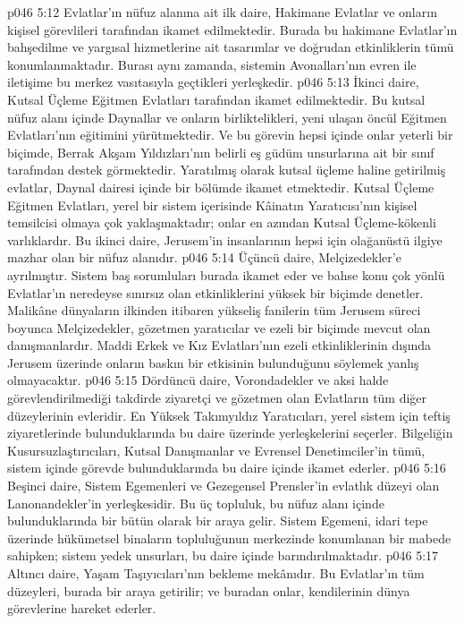 \vs p046 5:12 Evlatlar’ın nüfuz alanına ait ilk daire, Hakimane Evlatlar ve onların kişisel görevlileri tarafından ikamet edilmektedir. Burada bu hakimane Evlatlar’ın bahşedilme ve yargısal hizmetlerine ait tasarımlar ve doğrudan etkinliklerin tümü konumlanmaktadır. Burası aynı zamanda, sistemin Avonalları’nın evren ile iletişime bu merkez vasıtasıyla geçtikleri yerleşkedir.
\vs p046 5:13 İkinci daire, Kutsal Üçleme Eğitmen Evlatları tarafından ikamet edilmektedir. Bu kutsal nüfuz alanı içinde Daynallar ve onların birliktelikleri, yeni ulaşan öncül Eğitmen Evlatları’nın eğitimini yürütmektedir. Ve bu görevin hepsi içinde onlar yeterli bir biçimde, Berrak Akşam Yıldızları’nın belirli eş güdüm unsurlarına ait bir sınıf tarafından destek görmektedir. Yaratılmış olarak kutsal üçleme haline getirilmiş evlatlar, Daynal dairesi içinde bir bölümde ikamet etmektedir. Kutsal Üçleme Eğitmen Evlatları, yerel bir sistem içerisinde Kâinatın Yaratıcısı’nın kişisel temsilcisi olmaya çok yaklaşmaktadır; onlar en azından Kutsal Üçleme\hyp{}kökenli varlıklardır. Bu ikinci daire, Jerusem’in insanlarının hepsi için olağanüstü ilgiye mazhar olan bir nüfuz alanıdır.
\vs p046 5:14 Üçüncü daire, Melçizedekler’e ayrılmıştır. Sistem baş sorumluları burada ikamet eder ve bahse konu çok yönlü Evlatlar’ın neredeyse sınırsız olan etkinliklerini yüksek bir biçimde denetler. Malikâne dünyaların ilkinden itibaren yükseliş fanilerin tüm Jerusem süreci boyunca Melçizedekler, gözetmen yaratıcılar ve ezeli bir biçimde mevcut olan danışmanlardır. Maddi Erkek ve Kız Evlatları’nın ezeli etkinliklerinin dışında Jerusem üzerinde onların baskın bir etkisinin bulunduğunu söylemek yanlış olmayacaktır.
\vs p046 5:15 Dördüncü daire, Vorondadekler ve aksi halde görevlendirilmediği takdirde ziyaretçi ve gözetmen olan Evlatların tüm diğer düzeylerinin evleridir. En Yüksek Takımyıldız Yaratıcıları, yerel sistem için teftiş ziyaretlerinde bulunduklarında bu daire üzerinde yerleşkelerini seçerler. Bilgeliğin Kusursuzlaştırıcıları, Kutsal Danışmanlar ve Evrensel Denetimciler’in tümü, sistem içinde görevde bulunduklarında bu daire içinde ikamet ederler.
\vs p046 5:16 Beşinci daire, Sistem Egemenleri ve Gezegensel Prensler’in evlatlık düzeyi olan Lanonandekler’in yerleşkesidir. Bu üç topluluk, bu nüfuz alanı içinde bulunduklarında bir bütün olarak bir araya gelir. Sistem Egemeni, idari tepe üzerinde hükümetsel binaların topluluğunun merkezinde konumlanan bir mabede sahipken; sistem yedek unsurları, bu daire içinde barındırılmaktadır.
\vs p046 5:17 Altıncı daire, Yaşam Taşıyıcıları’nın bekleme mekânıdır. Bu Evlatlar’ın tüm düzeyleri, burada bir araya getirilir; ve buradan onlar, kendilerinin dünya görevlerine hareket ederler.
